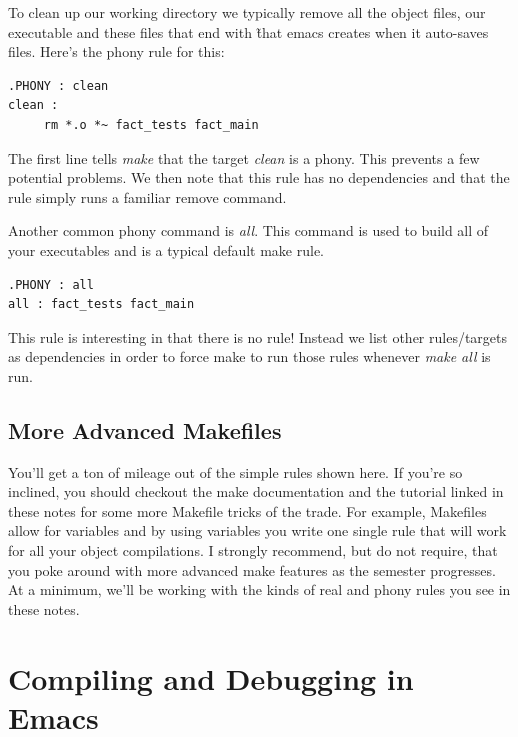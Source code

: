 \documentclass[]{tufte-handout}
\begin{document}
To clean up our working directory we typically remove all the object files, our executable and these files that end with \~ that emacs creates when it auto-saves files. Here's the phony rule for this:
\begin{verbatim}
.PHONY : clean
clean : 
     rm *.o *~ fact_tests fact_main 
\end{verbatim}
The first line tells \textit{make} that the target \textit{clean} is a phony. This prevents a few potential problems.  We then note that this rule has no dependencies and that the rule simply runs a familiar remove command. 

Another common phony command is \textit{all}. This command is used to build all of your executables and is a typical default make rule.
\begin{verbatim}
.PHONY : all
all : fact_tests fact_main
\end{verbatim}
This rule is interesting in that there is no rule! Instead we list other rules/targets as dependencies in order to force make to run those rules whenever \textit{make all} is run. 

\subsection{More Advanced Makefiles}

You'll get a ton of mileage out of the simple rules shown here. If you're so inclined, you should checkout the make documentation and the tutorial linked in these notes for some more Makefile tricks of the trade. For example, Makefiles allow for variables and by using variables you write one single rule that will work for all your object compilations.  I strongly recommend, but do not require, that you poke around with more advanced make features as the semester progresses. At a minimum, we'll be working with the kinds of real and phony rules you see in these notes. 

\section{Compiling and Debugging in Emacs}
\end{document}
